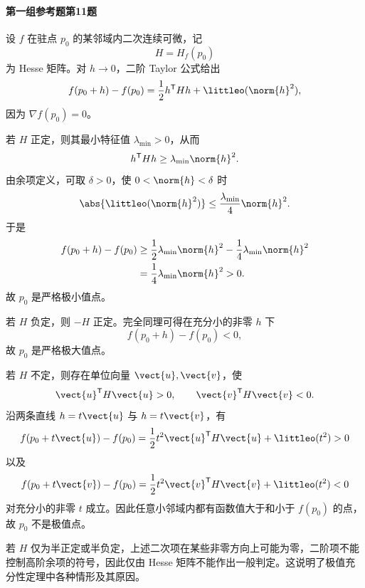 \paragraph{第一组参考题第11题}
\begin{xsolution}
设 $f$ 在驻点 $p_0$ 的某邻域内二次连续可微，记
\[
  H=H_f(p_0)
\]
为 Hesse 矩阵。对 $h\to0$，二阶 Taylor 公式给出
\[
  f(p_0+h)-f(p_0)
  =\frac12h^{\mathsf T}Hh+\littleo(\norm{h}^2),
\]
因为 $\nabla f(p_0)=0$。

若 $H$ 正定，则其最小特征值 $\lambda_{\min}>0$，从而
\[
  h^{\mathsf T}Hh\ge\lambda_{\min}\norm{h}^2.
\]
由余项定义，可取 $\delta>0$，使 $0<\norm{h}<\delta$ 时
\[
  \abs{\littleo(\norm{h}^2)}
  \le\frac{\lambda_{\min}}4\norm{h}^2.
\]
于是
\[
\begin{aligned}
  f(p_0+h)-f(p_0)
  &\ge\frac12\lambda_{\min}\norm{h}^2
  -\frac14\lambda_{\min}\norm{h}^2\\
  &=\frac14\lambda_{\min}\norm{h}^2>0.
\end{aligned}
\]
故 $p_0$ 是严格极小值点。

若 $H$ 负定，则 $-H$ 正定。完全同理可得在充分小的非零 $h$ 下
\[
  f(p_0+h)-f(p_0)<0,
\]
故 $p_0$ 是严格极大值点。

若 $H$ 不定，则存在单位向量 $\vect{u},\vect{v}$，使
\[
  \vect{u}^{\mathsf T}H\vect{u}>0,
  \qquad
  \vect{v}^{\mathsf T}H\vect{v}<0.
\]
沿两条直线 $h=t\vect{u}$ 与 $h=t\vect{v}$，有
\[
  f(p_0+t\vect{u})-f(p_0)
  =\frac12t^2\vect{u}^{\mathsf T}H\vect{u}+\littleo(t^2)>0
\]
以及
\[
  f(p_0+t\vect{v})-f(p_0)
  =\frac12t^2\vect{v}^{\mathsf T}H\vect{v}+\littleo(t^2)<0
\]
对充分小的非零 $t$ 成立。因此任意小邻域内都有函数值大于和小于 $f(p_0)$ 的点，故 $p_0$ 不是极值点。

若 $H$ 仅为半正定或半负定，上述二次项在某些非零方向上可能为零，二阶项不能控制高阶余项的符号，因此仅由 Hesse 矩阵不能作出一般判定。这说明了极值充分性定理中各种情形及其原因。
\end{xsolution}

